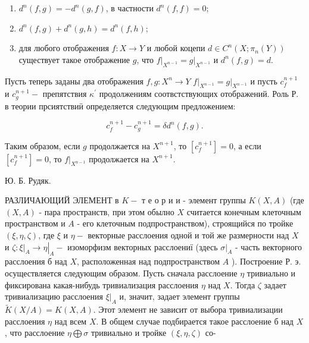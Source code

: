 \documentclass[10pt]{article}
\begin{document}
\begin{enumerate}

  \item $d^{n}(f, g)=-d^{n}(g, f)$, в частности $d^{n}(f, f)=0$;



  \item $d^{n}(f, g)+d^{n}(g, h)=d^{n}(f, h)$;



  \item для любого отображения $f: X \rightarrow Y$ и любой коцепи $d \in C^{n}\left(X ; \pi_{n}(Y)\right)$ существует такое отображение $g$, что $\left.f\right|_{X^{n-1}}=\left.g\right|_{X^{n-1}}$ и $d^{n}(f, g)=d$.



\end{enumerate}



Пусть теперь заданы два отображения $f, g: X^{n} \rightarrow Y$ $\left.f\right|_{X^{n-1}}=\left.g\right|_{X^{n-1}}$ и пусть $c_{f}^{n+1}$ и $c_{g}^{n+1}-$ препятствия $\kappa^{\prime}$ продолжениям соотвстствующих отображений. Роль Р. в теории прсиятствиӥ определяется следующим предложением:



\[

c_{f}^{n+1}-c_{g}^{n+1}=\delta d^{n}(f, g) .

\]



Таким образом, если $g$ продолжается на $X^{n+1}$, то $\left[c_{f}^{n+1}\right]=0$, а если $\left[c_{f}^{n+1}\right]=0$, то $\left.f\right|_{X^{n-1}}$ продолжается на $X^{n+1}$.



Ю. Б. Рудяк.



РАЗЛИЧАЮЩИЙ ЭЛЕМЕНТ в $K-$ т е о р и и - элемент группы $K(X, A)$ (где $(X, A)$ - пара пространств, при этом обылно $X$ считается конечным клеточным пространством и $A$ - его клеточным подпространством), строящийся по тройке $(\xi, \eta, \zeta)$, где $\xi$ и $\eta-$ векторные расслоения одной и той же размерности над $X$ и $\zeta:\left.\left.\xi\right|_{A} \rightarrow \eta\right|_{A}-$ изоморфизм векторных расслоениї (здесь $\left.\sigma\right|_{A}$ - часть векторного расслоения б над $X$, расположенная над подпространством $A$ ). Построение Р. э. осуществляется следующим образом. Пусть сначала расслоение $\eta$ тривиально и фиксирована какая-нибудь тривиализация расслоения $\eta$ над $X$. Тогда $\zeta$ задает тривиализацию расслоения $\left.\xi\right|_{A}$ и, значит, задает элемент группы $\tilde{K}(X / A)=K(X, A)$. Этот элемент не зависит от выбора тривиализации расслоения $\eta$ над всем $X$. В общем случае подбирается такое расслоение б над $X$, что расслоение $\eta \bigoplus \sigma$ тривиально и тройке $(\xi, \eta, \zeta)$ со-
\end{document}
